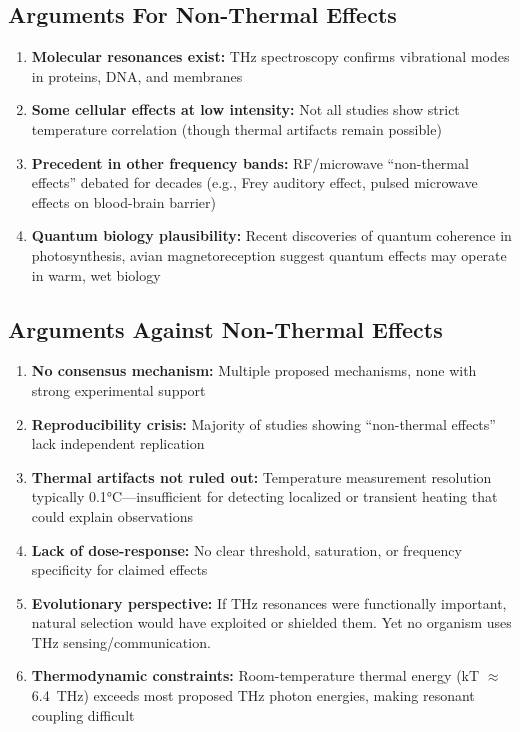 \subsection{Arguments For Non-Thermal Effects}

\begin{enumerate}
\item \textbf{Molecular resonances exist:} THz spectroscopy confirms vibrational modes in proteins, DNA, and membranes
\item \textbf{Some cellular effects at low intensity:} Not all studies show strict temperature correlation (though thermal artifacts remain possible)
\item \textbf{Precedent in other frequency bands:} RF/microwave ``non-thermal effects'' debated for decades (e.g., Frey auditory effect, pulsed microwave effects on blood-brain barrier)
\item \textbf{Quantum biology plausibility:} Recent discoveries of quantum coherence in photosynthesis, avian magnetoreception suggest quantum effects may operate in warm, wet biology
\end{enumerate}

\subsection{Arguments Against Non-Thermal Effects}

\begin{enumerate}
\item \textbf{No consensus mechanism:} Multiple proposed mechanisms, none with strong experimental support
\item \textbf{Reproducibility crisis:} Majority of studies showing ``non-thermal effects'' lack independent replication
\item \textbf{Thermal artifacts not ruled out:} Temperature measurement resolution typically 0.1°C---insufficient for detecting localized or transient heating that could explain observations
\item \textbf{Lack of dose-response:} No clear threshold, saturation, or frequency specificity for claimed effects
\item \textbf{Evolutionary perspective:} If THz resonances were functionally important, natural selection would have exploited or shielded them. Yet no organism uses THz sensing/communication.
\item \textbf{Thermodynamic constraints:} Room-temperature thermal energy (kT $\approx$ 6.4~THz) exceeds most proposed THz photon energies, making resonant coupling difficult
\end{enumerate}

